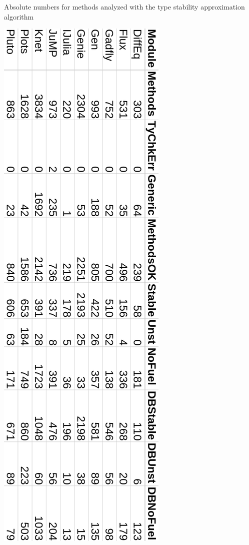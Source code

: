 \begin{table}%
\caption{Absolute numbers for methods analyzed with the type stability
  approximation algorithm}%
  \includegraphics[width=.56\textwidth]
  {figs/sts-eval/table-eval-abs-numbers-rot.png}
\label{table:app:eval:abs}
\end{table}

